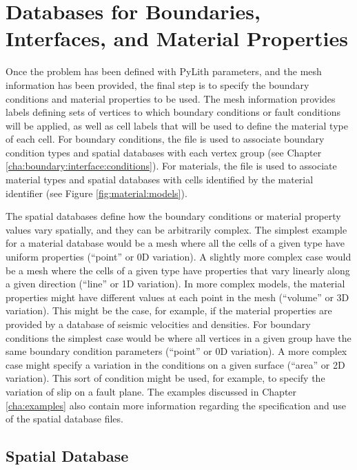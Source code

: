 \section{Databases for Boundaries, Interfaces, and Material Properties}
\label{sec:spatial:databases}

Once the problem has been defined with PyLith parameters, and the
mesh information has been provided, the final step is to specify the
boundary conditions and material properties to be used. The mesh information
provides labels defining sets of vertices to which boundary conditions
or fault conditions will be applied, as well as cell labels that will
be used to define the material type of each cell. For boundary conditions,
the  file is used to associate boundary condition types
and spatial databases with each vertex group (see Chapter \vref{cha:boundary:interface:conditions}).
For materials, the  file is used to associate material
types and spatial databases with cells identified by the material
identifier (see Figure \vref{fig:material:models}).

The spatial databases define how the boundary conditions or material
property values vary spatially, and they can be arbitrarily complex.
The simplest example for a material database would be a mesh where
all the cells of a given type have uniform properties (``point''
or 0D variation). A slightly more complex case would be a mesh where
the cells of a given type have properties that vary linearly along
a given direction (``line'' or 1D variation). In more complex models,
the material properties might have different values at each point
in the mesh (``volume'' or 3D variation). This might be the case,
for example, if the material properties are provided by a database
of seismic velocities and densities. For boundary conditions the simplest
case would be where all vertices in a given group have the same boundary
condition parameters (``point'' or 0D variation). A more complex
case might specify a variation in the conditions on a given surface
(``area'' or 2D variation). This sort of condition might be used,
for example, to specify the variation of slip on a fault plane. The
examples discussed in Chapter \vref{cha:examples} also contain more
information regarding the specification and use of the spatial database
files.


\subsection{ Spatial Database}

